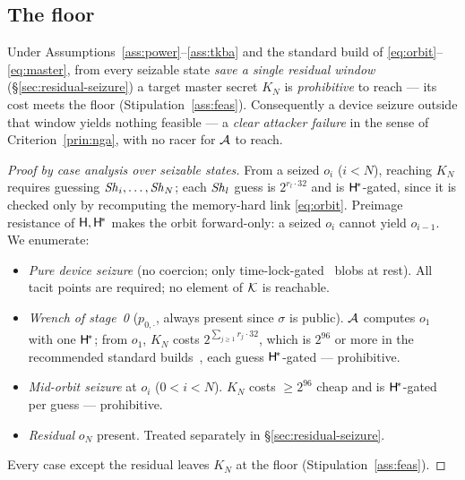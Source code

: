 \subsection{The floor}

\begin{theorem}\label{thm:floor}
Under Assumptions~\ref{ass:power}--\ref{ass:tkba} and the standard build of
\eqref{eq:orbit}--\eqref{eq:master}, from every seizable state \emph{save a single
residual window} (\S\ref{sec:residual-seizure}) a target master secret $K_N$ is
\emph{prohibitive} to reach --- its cost meets the floor
(Stipulation~\ref{ass:feas}). Consequently a device seizure outside that window
yields nothing feasible --- a \emph{clear attacker failure} in the sense of
Criterion~\ref{prin:nga}, with no racer for $\mathcal{A}$ to reach.
\end{theorem}

\begin{proof}[Proof by case analysis over seizable states]
From a seized $o_i$ ($i < N$), reaching $K_N$ requires guessing
$\mathit{Sh}_i, \dots, \mathit{Sh}_N$; each $\mathit{Sh}_l$ guess is $2^{r_l \cdot 32}$ and is
$\mathsf{H}^{\!*}$-gated, since it is checked only by recomputing the memory-hard link
\eqref{eq:orbit}. Preimage resistance of $\mathsf{H}, \mathsf{H}^{\!*}$ makes the orbit
forward-only: a seized $o_i$ cannot yield $o_{i-1}$. We enumerate:
\begin{itemize}[nosep,leftmargin=1.4em]
  \item \emph{Pure device seizure} (no coercion; only time-lock-gated~\cite{rsw1996}
        blobs at rest). All tacit points are required; no element of $\mathcal{K}$ is reachable.
  \item \emph{Wrench of stage~0} ($p_{0,\cdot}$, always present since $\sigma$ is
        public). $\mathcal{A}$ computes $o_1$ with one $\mathsf{H}^{\!*}$; from $o_1$, $K_N$
        costs $2^{\sum_{j\ge 1} r_j\cdot 32}$, which is $2^{96}$ or more in the
        recommended standard builds~\cite{gw-design}, each guess $\mathsf{H}^{\!*}$-gated ---
        prohibitive.
  \item \emph{Mid-orbit seizure} at $o_i$ ($0 < i < N$). $K_N$ costs $\ge 2^{96}$
        cheap and is $\mathsf{H}^{\!*}$-gated per guess --- prohibitive.
  \item \emph{Residual} $o_N$ present. Treated separately in
        \S\ref{sec:residual-seizure}.
\end{itemize}
Every case except the residual leaves $K_N$ at the floor
(Stipulation~\ref{ass:feas}).
\end{proof}

